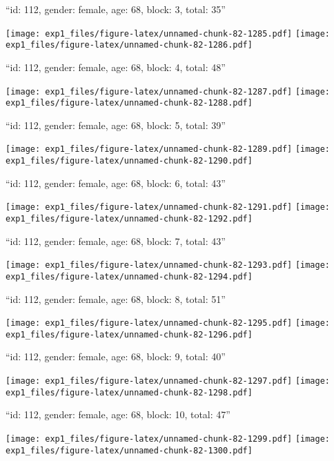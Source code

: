 \documentclass[11pt,,]{article}
\begin{document}
\newpage
[1] 

``id: 112, gender: female, age: 68, block: 3, total: 35''

\texttt{[image: exp1\_files/figure-latex/unnamed-chunk-82-1285.pdf]}
\texttt{[image: exp1\_files/figure-latex/unnamed-chunk-82-1286.pdf]}

\newpage
[1] 

``id: 112, gender: female, age: 68, block: 4, total: 48''

\texttt{[image: exp1\_files/figure-latex/unnamed-chunk-82-1287.pdf]}
\texttt{[image: exp1\_files/figure-latex/unnamed-chunk-82-1288.pdf]}

\newpage
[1] 

``id: 112, gender: female, age: 68, block: 5, total: 39''

\texttt{[image: exp1\_files/figure-latex/unnamed-chunk-82-1289.pdf]}
\texttt{[image: exp1\_files/figure-latex/unnamed-chunk-82-1290.pdf]}

\newpage
[1] 

``id: 112, gender: female, age: 68, block: 6, total: 43''

\texttt{[image: exp1\_files/figure-latex/unnamed-chunk-82-1291.pdf]}
\texttt{[image: exp1\_files/figure-latex/unnamed-chunk-82-1292.pdf]}

\newpage
[1] 

``id: 112, gender: female, age: 68, block: 7, total: 43''

\texttt{[image: exp1\_files/figure-latex/unnamed-chunk-82-1293.pdf]}
\texttt{[image: exp1\_files/figure-latex/unnamed-chunk-82-1294.pdf]}

\newpage
[1] 

``id: 112, gender: female, age: 68, block: 8, total: 51''

\texttt{[image: exp1\_files/figure-latex/unnamed-chunk-82-1295.pdf]}
\texttt{[image: exp1\_files/figure-latex/unnamed-chunk-82-1296.pdf]}

\newpage
[1] 

``id: 112, gender: female, age: 68, block: 9, total: 40''

\texttt{[image: exp1\_files/figure-latex/unnamed-chunk-82-1297.pdf]}
\texttt{[image: exp1\_files/figure-latex/unnamed-chunk-82-1298.pdf]}

\newpage
[1] 

``id: 112, gender: female, age: 68, block: 10, total: 47''

\texttt{[image: exp1\_files/figure-latex/unnamed-chunk-82-1299.pdf]}
\texttt{[image: exp1\_files/figure-latex/unnamed-chunk-82-1300.pdf]}
\end{document}
